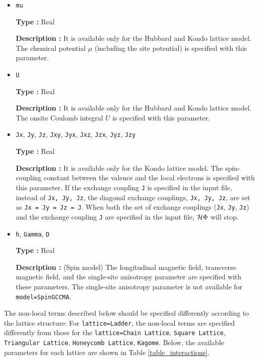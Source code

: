 \begin{itemize}

\item \verb|mu|

{\bf Type :} Real

{\bf Description :}
It is available only for the Hubbard and Kondo lattice model.
The chemical potential $\mu$ (including the site potential)
is specified with this parameter.

\item \verb|U|

{\bf Type :} Real

{\bf Description :}
It is available only for the Hubbard and Kondo lattice model.
The onsite Coulomb integral $U$ is specified with this parameter.

\item \verb|Jx|, \verb|Jy|, \verb|Jz|, \verb|Jxy|, 
  \verb|Jyx|, \verb|Jxz|, \verb|Jzx|, \verb|Jyz|, \verb|Jzy|

{\bf Type :} Real

{\bf Description :}
It is available only for the Kondo lattice model.
The spin-coupling constant between the valence and the local electrons
is specified with this parameter.
If the exchange coupling \verb|J| is specified in the input file,
instead of \verb|Jx, Jy, Jz|,
the diagonal exchange couplings, \verb|Jx, Jy, Jz|, are set as \verb|Jx = Jy = Jz = J|.
When both
the set of exchange couplings (\verb|Jx|, \verb|Jy|, \verb|Jz|)
and the exchange coupling \verb|J| are specified in the input file,
$\mathcal{H} \Phi$ will stop.

\item \verb|h|, \verb|Gamma|, \verb|D|

{\bf Type :} Real

{\bf Description :} (Spin model)
The longitudinal magnetic field, transverse magnetic field, 
and the single-site anisotropy parameter are specified with these parameters.
The single-site anisotropy parameter is not available for \verb|model=SpinGCCMA|.

\end{itemize}

The non-local terms described below should be specified
differently according to the lattice structure:
For \verb|lattice=Ladder|, the non-local terms are specified differently
from those for the \verb|lattice=Chain Lattice|, \verb|Square Lattice|, \verb|Triangular Lattice|, \verb|Honeycomb Lattice|, \verb|Kagome|. 
Below, the available parameters for each lattice are shown in
Table \ref{table_interactions}.


